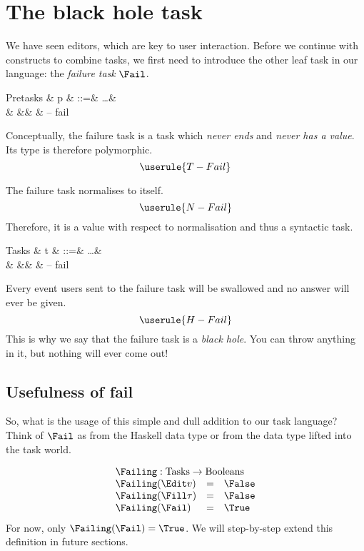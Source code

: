 
\section{The black hole task}

We have seen editors,
which are key to user interaction.
Before we continue with constructs to combine tasks,
we first need to introduce the other leaf task in our language:
the \emph{failure task} $\Fail$.

\begin{grammar}
  Pretasks
    & p & ::=& \ldots & \\
    &   &\mid& \Fail  & – fail \\
\end{grammar}
Conceptually,
the failure task is a task which \emph{never ends} and \emph{never has a value}.
Its type is therefore polymorphic.
\begin{equation*}
  \userule{T-Fail}
\end{equation*}

The failure task normalises to itself.
\begin{equation*}
  \userule{N-Fail}
\end{equation*}
Therefore,
it is a value with respect to normalisation and thus a syntactic task.
\begin{grammar}
  Tasks
    & t & ::=& \ldots & \\
    &   &\mid& \Fail  & – fail \\
\end{grammar}

Every event users sent to the failure task will be swallowed
and no answer will ever be given.
\begin{equation*}
  \userule{H-Fail}
\end{equation*}
This is why we say that the failure task is a \emph{black hole}.
You can throw anything in it,
but nothing will ever come out!


\subsection{Usefulness of fail}

So, what is the usage of this simple and dull addition to our task language?
Think of $\Fail$ as  from the Haskell  data type
or  from the \ML {} data type lifted into the task world.

\begin{equation*}
  \begin{array}{lcl}
    \multicolumn{3}{l}{\Failing : \mathrm{Tasks} \to \mathrm{Booleans}} \\
    \Failing(\Edit v)    &=& \False \\
    \Failing(\Fill \tau) &=& \False \\
    \Failing(\Fail)      &=& \True
  \end{array}
\end{equation*}
For now,
only $\Failing(\Fail) = \True$.
We will step-by-step extend this definition in future sections.


